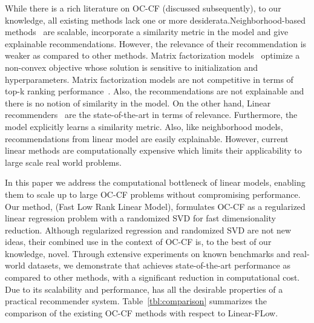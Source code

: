 \documentclass{article}
\newcommand{\citep}{\cite}
\begin{document}
While there is a rich literature on OC-CF (discussed subsequently),
to our knowledge, all existing methods lack one
or more desiderata.Neighborhood-based methods~\citep{Sarwar:2001, Linden:2003} are scalable, incorporate a similarity metric in the model and give explainable recommendations. However, the relevance of their recommendation is weaker as compared to other methods. Matrix factorization models~\citep{Hu:2008} optimize a non-convex objective whose solution is sensitive to initialization and hyperparameters. Matrix factorization models are  %
not competitive in terms of top-k ranking performance~\cite{Ning:2011, Sedhain:2016}. Also, the recommendations are not explainable and there is no notion of similarity in the model. On the other hand, Linear recommenders~\cite{Ning:2011, Sedhain:2016} are the state-of-the-art in terms of relevance. Furthermore, the model explicitly learns a similarity metric. Also, like neighborhood models, recommendations from linear model are easily explainable. However, current linear methods are computationally expensive which limits their applicability to large scale real world problems.

In this paper we address the computational bottleneck of linear models, enabling them to scale up to large OC-CF problems without compromising performance. Our method, \LinearLow (Fast Low Rank Linear Model), formulates OC-CF as a regularized linear regression problem with a randomized SVD for fast dimensionality reduction.
Although regularized regression and randomized SVD are not new ideas,  their combined use in the context of OC-CF is,  to the best of our knowledge, novel.
Through extensive experiments on known benchmarks and real-world datasets, we demonstrate that \LinearLow achieves state-of-the-art performance as
compared to other methods, with a significant reduction in computational cost.  Due to its scalability and performance,
\LinearLow has all the desirable properties of a practical recommender system. Table~\ref{tbl:comparison} summarizes the comparison of the existing OC-CF methods with respect to Linear-FLow.
\end{document}
